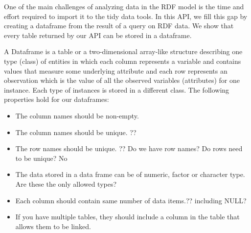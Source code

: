 One of the main challenges of analyzing data in the RDF model is the time and effort required to import it to the tidy data tools. In this API, we fill this gap by creating a dataframe from the result of a \sparql query on RDF data. We show that every table returned by our API can be stored in a dataframe.

A Dataframe is a table or a two-dimensional array-like structure describing one type (class) of entities in which each column represents a variable and contains values that measure some underlying attribute and each row represents an observation which is the value of all the observed variables (attributes) for one instance. Each type of instances is stored in a different class.  The following properties hold for our dataframes:
\begin{itemize}
    \item The column names should be non-empty.
    \item The column names should be unique. ??
    \item The row names should be unique. ?? Do we have row names? Do rows need to be unique? No
    \item The data stored in a data frame can be of numeric, factor or character type. Are these the only allowed types?
    \item Each column should contain same number of data items.?? including NULL?
    \item If you have multiple tables, they should include a column in the table that allows them to be linked.
\end{itemize}{}

